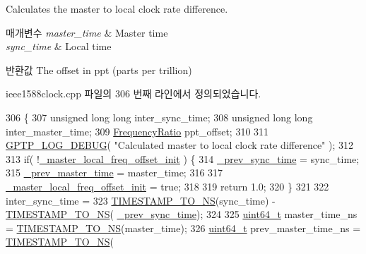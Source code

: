 Calculates the master to local clock rate difference. 


\begin{DoxyParams}{매개변수}
{\em master\+\_\+time} & Master time \\
\hline
{\em sync\+\_\+time} & Local time \\
\hline
\end{DoxyParams}
\begin{DoxyReturn}{반환값}
The offset in ppt (parts per trillion) 
\end{DoxyReturn}


ieee1588clock.\+cpp 파일의 306 번째 라인에서 정의되었습니다.


\begin{DoxyCode}
306                                                                                                            
        \{
307     \textcolor{keywordtype}{unsigned} \textcolor{keywordtype}{long} \textcolor{keywordtype}{long} inter\_sync\_time;
308     \textcolor{keywordtype}{unsigned} \textcolor{keywordtype}{long} \textcolor{keywordtype}{long} inter\_master\_time;
309     \hyperlink{ptptypes_8hpp_a84de47dc2ed889ecd2b61706d3ad0f2e}{FrequencyRatio} ppt\_offset;
310 
311     \hyperlink{gptp__log_8hpp_ae4c6efe7c9cf6d7d3bbd28a0fd087d61}{GPTP\_LOG\_DEBUG}( \textcolor{stringliteral}{"Calculated master to local clock rate difference"} );
312 
313     \textcolor{keywordflow}{if}( !\hyperlink{class_i_e_e_e1588_clock_abca95b219ee50066ce65ca36310c3aa3}{\_master\_local\_freq\_offset\_init} ) \{
314         \hyperlink{class_i_e_e_e1588_clock_af8fc87788a60f7d64b3172beb18e3b45}{\_prev\_sync\_time} = sync\_time;
315         \hyperlink{class_i_e_e_e1588_clock_a63a3a60d4d184a1255e92d9c881ba81b}{\_prev\_master\_time} = master\_time;
316 
317         \hyperlink{class_i_e_e_e1588_clock_abca95b219ee50066ce65ca36310c3aa3}{\_master\_local\_freq\_offset\_init} = \textcolor{keyword}{true};
318 
319         \textcolor{keywordflow}{return} 1.0;
320     \}
321 
322     inter\_sync\_time =
323         \hyperlink{ieee1588_8hpp_a0f6cecd8adce4a7314f084f3ead49999}{TIMESTAMP\_TO\_NS}(sync\_time) - \hyperlink{ieee1588_8hpp_a0f6cecd8adce4a7314f084f3ead49999}{TIMESTAMP\_TO\_NS}(
      \hyperlink{class_i_e_e_e1588_clock_af8fc87788a60f7d64b3172beb18e3b45}{\_prev\_sync\_time});
324 
325     \hyperlink{parse_8c_aec6fcb673ff035718c238c8c9d544c47}{uint64\_t} master\_time\_ns = \hyperlink{ieee1588_8hpp_a0f6cecd8adce4a7314f084f3ead49999}{TIMESTAMP\_TO\_NS}(master\_time);
326     \hyperlink{parse_8c_aec6fcb673ff035718c238c8c9d544c47}{uint64\_t} prev\_master\_time\_ns = \hyperlink{ieee1588_8hpp_a0f6cecd8adce4a7314f084f3ead49999}{TIMESTAMP\_TO\_NS}(

\end{DoxyCode}
